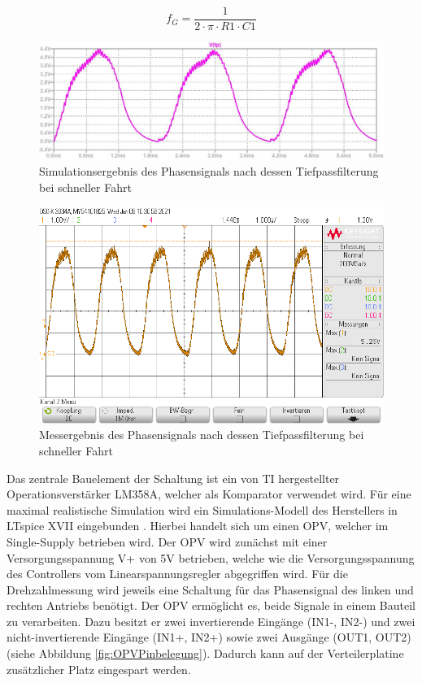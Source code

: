 \begin{equation}\label{eq4.2}
f_G = \frac{ 1 }{2 \cdot \pi \cdot R1\cdot C1 }
\end{equation}

\begin{figure}[H] %
\includegraphics[width=.82\textwidth]{sec4/images/Spannungsverlauf_TP} 
\centering
\captionsetup{width=.95\textwidth}
\caption[Simulationsergebnis des Phasensignals nach dessen Tiefpassfilterung]{Simulationsergebnis des Phasensignals nach dessen Tiefpassfilterung bei schneller Fahrt}\centering
\label{fig:SpannungsverlaufTPSpice}
\end{figure}

\begin{figure}[H] %
\includegraphics[width=.75\textwidth]{sec4/images/TP} 
\centering
\captionsetup{width=.95\textwidth}
\caption[Messergebnis des Phasensignals nach dessen Tiefpassfilterung]{Messergebnis des Phasensignals nach dessen Tiefpassfilterung bei schneller Fahrt}\centering
\label{fig:SpannungsverlaufTPReal}
\end{figure}

Das zentrale Bauelement der Schaltung ist ein von \ac{TI} hergestellter Operationsverstärker LM358A, welcher als Komparator verwendet wird. Für eine maximal realistische Simulation wird ein Simulations-Modell des Herstellers in LTspice XVII eingebunden \cite{OPVModel}. Hierbei handelt sich um einen \ac{OPV}, welcher im Single-Supply betrieben wird. Der \ac{OPV} wird zunächst mit einer Versorgungsspannung V+ von 5V betrieben, welche wie die Versorgungsspannung des Controllers vom Linearspannungsregler abgegriffen wird. Für die Drehzahlmessung wird jeweils eine Schaltung für das Phasensignal des linken und rechten Antriebs benötigt. Der \ac{OPV} ermöglicht es, beide Signale in einem Bauteil zu verarbeiten. Dazu besitzt er zwei invertierende Eingänge (IN1-, IN2-) und zwei nicht-invertierende Eingänge (IN1+, IN2+) sowie zwei Ausgänge (OUT1, OUT2) (siehe Abbildung \ref{fig:OPVPinbelegung}). Dadurch kann auf der Verteilerplatine zusätzlicher Platz eingespart werden.

